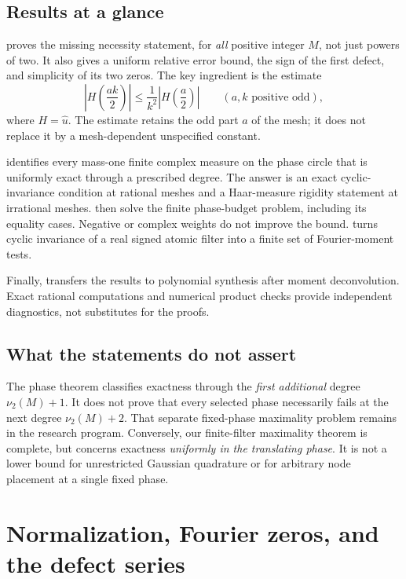 \documentclass[11pt,a4paper]{article}
\numberwithin{equation}{section}
\theoremstyle{plain}
\theoremstyle{definition}
\theoremstyle{remark}
\begin{document}
\subsection{Results at a glance}

 proves the missing necessity statement, for
\emph{all} positive integer $M$, not just powers of two. It also gives a
uniform relative error bound, the sign of the first defect, and simplicity
of its two zeros. The key ingredient is the estimate
\[
 \left|H\!\left(\frac{ak}{2}\right)\right|
 \le \frac1{k^2}\left|H\!\left(\frac a2\right)\right|
 \qquad(a,k\text{ positive odd}),
\]
where $H=\widehat u$. The estimate retains the odd part $a$ of the mesh;
it does not replace it by a mesh-dependent unspecified constant.

 identifies every mass-one finite complex
measure on the phase circle that is uniformly exact through a prescribed
degree. The answer is an exact cyclic-invariance condition at rational
meshes and a Haar-measure rigidity statement at irrational meshes.
 then solve the finite phase-budget problem,
including its equality cases. Negative or complex weights do not improve
the bound.  turns cyclic invariance of a real
signed atomic filter into a finite set of Fourier-moment tests.

Finally,  transfers the results to polynomial synthesis
after moment deconvolution. Exact rational computations and numerical
product checks provide independent diagnostics, not substitutes for the
proofs.

\subsection{What the statements do not assert}

The phase theorem classifies exactness through the \emph{first additional}
degree $\nu_2(M)+1$. It does not prove that every selected phase necessarily
fails at the next degree $\nu_2(M)+2$. That separate fixed-phase maximality
problem remains in the research program. Conversely, our finite-filter
maximality theorem is complete, but concerns exactness \emph{uniformly in
the translating phase}. It is not a lower bound for unrestricted Gaussian
quadrature or for arbitrary node placement at a single fixed phase.

\section{Normalization, Fourier zeros, and the defect series}
\label{sec:preliminaries}
\end{document}
